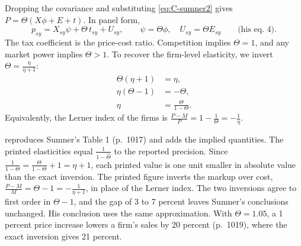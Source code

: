 Dropping the covariance and substituting \eqref{eq:C-sumner2} gives $P = \Theta(X\phi + E + t)$. In panel form,
\begin{equation}\label{eq:C-sumner4}
p_{sy} = X_{sy}\psi + \Theta\,t_{sy} + U_{sy}, \qquad \psi = \Theta\phi, \quad U_{sy} = \Theta E_{sy}
\qquad \text{(his eq.~4)} .
\end{equation}
The tax coefficient is the price-cost ratio. Competition implies $\Theta = 1$, and any market power implies
$\Theta > 1$. To recover the firm-level elasticity, we invert $\Theta = \frac{\eta}{\eta + 1}$:
\begin{align*}
\Theta(\eta + 1) &= \eta , \\
\eta(\Theta - 1) &= -\Theta , \\
\eta &= \frac{\Theta}{1 - \Theta} .
\end{align*}
Equivalently, the Lerner index of the firms is $\frac{P - M}{P} = 1 - \frac{1}{\Theta} = -\frac{1}{\eta}$.

 reproduces Sumner's Table 1 (p.~1017) and adds the implied quantities. The printed
elasticities equal $\frac{1}{1 - \hat\Theta}$ to the reported precision. Since
$\frac{1}{1 - \Theta} = \frac{\Theta}{1 - \Theta} + 1 = \eta + 1$, each printed value is one unit smaller in absolute
value than the exact inversion. The printed figure inverts the markup over cost, $\frac{P - M}{M} = \Theta - 1 =
-\frac{1}{\eta + 1}$, in place of the Lerner index. The two inversions agree to first order in $\Theta - 1$, and the
gap of 3 to 7 percent leaves Sumner's conclusions unchanged. His conclusion uses the same approximation. With
$\Theta = 1.05$, a 1 percent price increase lowers a firm's sales by 20 percent (p.~1019), where the exact inversion
gives 21 percent.

